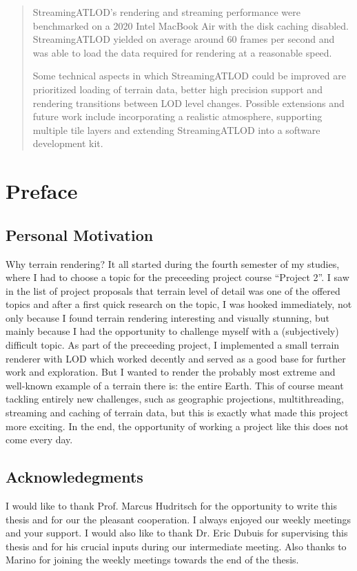 \documentclass[10pt,a4paper]{report}
\begin{document}
\begin{abstract}
StreamingATLOD's rendering and streaming performance were benchmarked 
on a 2020 Intel MacBook Air with the disk caching disabled. StreamingATLOD yielded 
on average around 60 frames per second and was able to load 
the data required for rendering at a reasonable speed.

Some technical aspects in which StreamingATLOD could be improved are 
prioritized loading of terrain data, better high precision support
and rendering transitions between LOD level changes.
Possible extensions and future work include incorporating 
a realistic atmosphere, supporting multiple tile layers and
extending StreamingATLOD into a software development kit. 

\end{abstract}

\renewcommand\lstlistlistingname{List of Listings}

\tableofcontents

\listoftables
\listoffigures
\lstlistoflistings

\chapter*{Preface}
\thispagestyle{empty}
\section*{Personal Motivation}
Why terrain rendering? It all started during the 
fourth semester of my studies, 
where I had to choose a topic for 
the preceeding project course ``Project 2''. 
I saw in the list of project proposals that 
terrain level of detail was one 
of the offered topics and after a first quick research
on the topic, I was hooked immediately, not
only because I found terrain rendering interesting and visually stunning, 
but mainly because I had the opportunity to challenge myself
with a (subjectively) difficult topic.
As part of the preceeding project, I implemented a small terrain  
renderer with LOD which worked decently and served 
as a good base for further work and exploration.
But I wanted to render the probably most extreme 
and well-known example of a terrain there is: 
the entire Earth.
This of course meant tackling entirely new challenges,
such as geographic projections,
multithreading, streaming and caching of terrain data,
but this is exactly what made this project more exciting.
In the end, the opportunity of working a project like this 
does not come every day.

\section*{Acknowledegments}
I would like to thank Prof. Marcus Hudritsch 
for the opportunity to write this thesis
and for our the pleasant cooperation.
I always enjoyed our weekly meetings
and your support. I would also 
like to thank Dr. Eric Dubuis 
for supervising this thesis and for 
his crucial inputs during our intermediate meeting.
Also thanks to Marino for joining the weekly meetings 
towards the end of the thesis.
\end{document}
